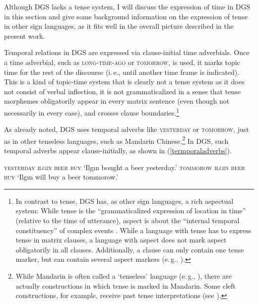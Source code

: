 \noindent Although DGS lacks a tense system, I will discuss the expression of time in DGS in this section and give some background information on the expression of tense in other sign languages, as it fits well in the overall picture described in the present work.

Temporal relations in DGS are expressed via clause-initial time adverbials. Once a time adverbial, such as \textsc{long-time-ago} or \textsc{tomorrow}, is used, it marks topic time for the rest of the discourse (i.\,e., until another time frame is indicated). This is a kind of topic-time system that is clearly not a tense system as it does not consist of verbal inflection, it is not grammaticalized in a sense that tense morphemes obligatorily appear in every matrix sentence (even though not necessarily in every case), and crosses clause boundaries.\footnote{ In contrast to tense, DGS has, as other sign languages, a rich aspectual system: While tense is the ``grammaticalized expression of location in time'' (relative to the time of utterance), aspect is about the ``internal temporal constituency'' of complex events \citep[9--10]{comrie1985tense}. While a language with tense has to express tense in matrix clauses, a language with aspect does not mark aspect obligatorily in all clauses. Additionally, a clause can only contain one tense marker, but can contain several aspect markers (e.\,g., \citealt[18--19]{judith2006temporal}). }

As already noted, DGS uses temporal adverbs like \textsc{yesterday} or \textsc{tomorrow}, just as in other tenseless languages, such as Mandarin Chinese.\footnote{ While Mandarin is often called a `tenseless' language (e.\,g., \citealt{lin2006time, lin2012tenselessness}), there are actually constructions in which tense is marked in Mandarin. Some cleft constructions, for example, receive past tense interpretations (see \citealt{hole2011deconstruction}).} In DGS, such temporal adverbs appear clause-initially, as shown in (\ref{termporaladverbs}).

\begin{exe} 
\ex\label{termporaladverbs}\begin{xlist}
\ex\textsc{yesterday ilg\i n beer buy} \label{yesterdaypaula} 
\glt `Ilg\i n bought a beer yesterday.'
\ex\textsc{tommorow ilg\i n beer buy} \label{yesterdaypaulb} 
\glt `Ilg\i n will buy a beer tommorow.'
\end{xlist}
\end{exe}  

